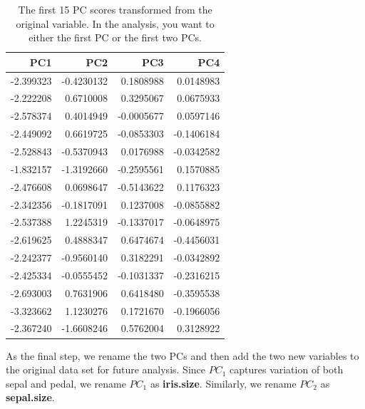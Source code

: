 \documentclass[
]{book}
\begin{document}
\begin{table}

\caption{\label{tab:unnamed-chunk-217}The first 15 PC scores transformed from the original variable. In the analysis, you want to either the first PC or the first two PCs.}
\centering
\begin{tabular}[t]{r|r|r|r}
\hline
PC1 & PC2 & PC3 & PC4\\
\hline
-2.399323 & -0.4230132 & 0.1808988 & 0.0148983\\
\hline
-2.222208 & 0.6710008 & 0.3295067 & 0.0675933\\
\hline
-2.578374 & 0.4014949 & -0.0005677 & 0.0597146\\
\hline
-2.449092 & 0.6619725 & -0.0853303 & -0.1406184\\
\hline
-2.528843 & -0.5370943 & 0.0176988 & -0.0342582\\
\hline
-1.832157 & -1.3192660 & -0.2595561 & 0.1570885\\
\hline
-2.476608 & 0.0698647 & -0.5143622 & 0.1176323\\
\hline
-2.342356 & -0.1817091 & 0.1237008 & -0.0855882\\
\hline
-2.537388 & 1.2245319 & -0.1337017 & -0.0648975\\
\hline
-2.619625 & 0.4888347 & 0.6474674 & -0.4456031\\
\hline
-2.242377 & -0.9560140 & 0.3182291 & -0.0342892\\
\hline
-2.425334 & -0.0555452 & -0.1031337 & -0.2316215\\
\hline
-2.693003 & 0.7631906 & 0.6418480 & -0.3595538\\
\hline
-3.323662 & 1.1230276 & 0.1721670 & -0.1966056\\
\hline
-2.367240 & -1.6608246 & 0.5762004 & 0.3128922\\
\hline
\end{tabular}
\end{table}

As the final step, we rename the two PCs and then add the two new variables to the original data set for future analysis. Since \(PC_1\) captures variation of both sepal and pedal, we rename \(PC_1\) as \textbf{iris.size}. Similarly, we rename \(PC_2\) as \textbf{sepal.size}.
\end{document}
